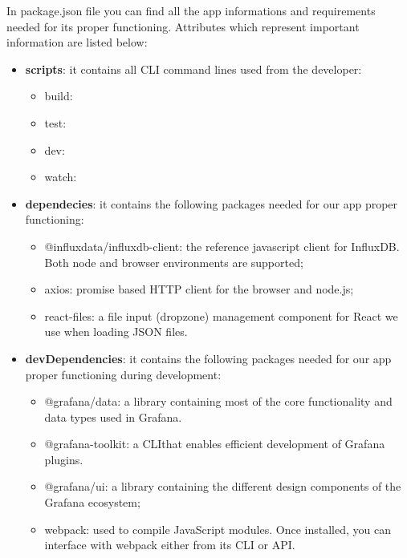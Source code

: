 		In package.json file you can find all the app informations and requirements needed for its proper functioning. Attributes which represent important information are listed below:
		\begin{itemize}
			\item\textbf{scripts}: it contains all CLI command lines used from the developer: 
				\begin{itemize}
				\item build:
				\item test:
				\item dev:
				\item watch:
			\end{itemize}
			\item\textbf{dependecies}: it contains the following packages needed for our app proper functioning:
			\begin{itemize}
				\item @influxdata/influxdb-client: the reference javascript client for InfluxDB. Both node and browser environments are supported;
    			\item axios: promise based HTTP client for the browser and node.js;
    			\item react-files: a file input (dropzone) management component for React we use when loading JSON files.
			\end{itemize}
			\item\textbf{devDependencies}: it contains the following packages needed for our app proper functioning during development:
			\begin{itemize}
				\item @grafana/data: a library containing most of the core functionality and data types used in Grafana.
				\item @grafana-toolkit: a CLI\glo that enables efficient development of Grafana plugins.
				\item @grafana/ui: a library containing the different design components of the Grafana ecosystem;
				\item webpack: used to compile JavaScript modules. Once installed, you can interface with webpack either from its CLI or API.
			\end{itemize}
		\end{itemize}
	